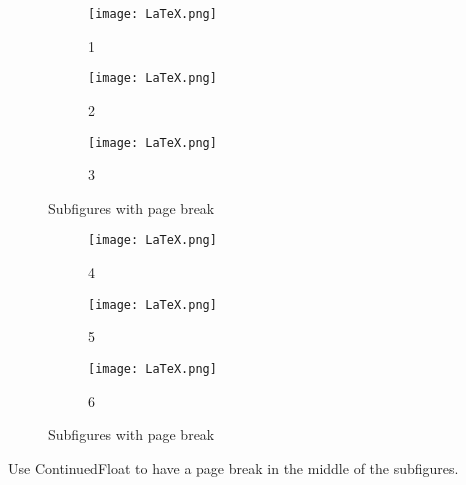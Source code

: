 \documentclass{article}
\begin{document}
\begin{figure}[hb!]
  \centering
  \begin{subfigure}[b]{\linewidth}
    \texttt{[image: LaTeX.png]}
    \caption{1}
  \end{subfigure}
  \begin{subfigure}[b]{\linewidth}
    \texttt{[image: LaTeX.png]}
    \caption{2}
  \end{subfigure}
  \begin{subfigure}[b]{\linewidth}
    \texttt{[image: LaTeX.png]}
    \caption{3}
  \end{subfigure}
  \caption{Subfigures with page break}
  \label{fig:LaTeX5}
\end{figure}
\begin{figure}[h!]
  \ContinuedFloat
  \centering
  \begin{subfigure}[b]{\linewidth}
    \texttt{[image: LaTeX.png]}
    \caption{4}
  \end{subfigure}
  \begin{subfigure}[b]{\linewidth}
    \texttt{[image: LaTeX.png]}
    \caption{5}
  \end{subfigure}
  \begin{subfigure}[b]{\linewidth}
    \texttt{[image: LaTeX.png]}
    \caption{6}
  \end{subfigure}
  \caption{Subfigures with page break}
  \label{fig:LaTeX5}
\end{figure}
Use ContinuedFloat to have a page break in the middle of the subfigures.
\end{document}
